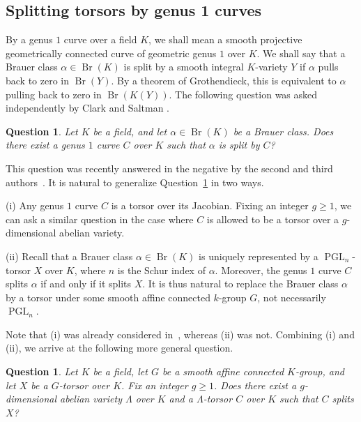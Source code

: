 \documentclass[12pt]{amsart}
\numberwithin{equation}{section}
\newtheorem{question}[theorem]{Question}
\theoremstyle{remark}
\newcommand{\PGL}{\operatorname{PGL}}
\newcommand{\Br}{\operatorname{Br}}
\newcommand{\on}{\operatorname}
\begin{document}
\subsection{Splitting torsors by genus 1 curves}
	By a genus $1$ curve over a field $K$, we shall mean a smooth projective geometrically connected curve of geometric genus $1$ over $K$. We shall say that a Brauer class $\alpha\in \on{Br}(K)$ is split by a smooth integral $K$-variety $Y$ if $\alpha$ pulls back to zero in $\on{Br}(Y)$. By a theorem of Grothendieck, this is equivalent to $\alpha$ pulling back to zero in $\on{Br}(K(Y))$. The following question was asked independently by Clark \cite{clark2008open} and Saltman \cite{ruozzi2011rage}.
	
	\begin{question} \label{question-clark-saltman}
		Let $K$ be a field, and let $\alpha\in \Br(K)$ be a Brauer class. Does there exist a genus $1$ curve $C$ over $K$ such that $\alpha$ is split by $C$?
	\end{question}

This question was recently answered in the negative by the second and third authors~\cite{genus1}. It is natural to generalize Question~\ref{question-clark-saltman} in two ways. 

\smallskip
(i) Any genus $1$ curve $C$ is a torsor over its Jacobian. Fixing an integer $g \geqslant 1$, we can ask a similar question in the case where $C$ is allowed to be a torsor over a $g$-dimensional abelian variety. 

\smallskip
(ii) Recall that
a Brauer class $\alpha \in \Br(K)$ is uniquely represented by a $\PGL_n$-torsor
$X$ over $K$, where $n$ is the Schur index of $\alpha$. Moreover, the genus $1$ curve $C$ splits $\alpha$ if and only if it splits $X$. It is thus natural to replace the Brauer class $\alpha$ by a torsor under some smooth affine connected $k$-group $G$, not necessarily $\PGL_n$. 

\smallskip
\noindent Note that (i) was already considered in~\cite{genus1}, whereas (ii) was not. Combining (i) and (ii), we arrive at the following more general question.

	\begin{question} \label{question-clark-saltman2}
    Let $K$ be a field, let $G$ be a smooth affine connected $K$-group, and let
    $X$ be a $G$-torsor over $K$. Fix an integer $g \geqslant 1$.  Does there exist a $g$-dimensional abelian variety $\Lambda$ over $K$ and a $\Lambda$-torsor $C$ over $K$ such that $C$ splits $X$?
    \end{question}
\end{document}
